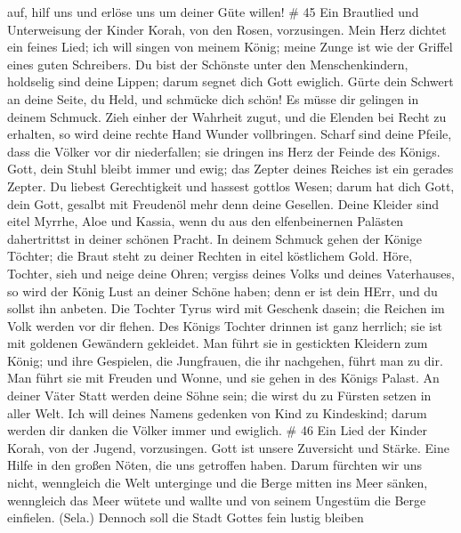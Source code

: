 auf, hilf uns und erlöse uns um deiner Güte willen! \# 45 
Ein Brautlied und Unterweisung der Kinder Korah, von den Rosen,
vorzusingen.  Mein Herz dichtet ein feines Lied; ich will
singen von meinem König; meine Zunge ist wie der Griffel eines guten
Schreibers.  Du bist der Schönste unter den Menschenkindern,
holdselig sind deine Lippen; darum segnet dich Gott ewiglich.
 Gürte dein Schwert an deine Seite, du Held, und schmücke
dich schön!  Es müsse dir gelingen in deinem Schmuck. Zieh
einher der Wahrheit zugut, und die Elenden bei Recht zu erhalten, so
wird deine rechte Hand Wunder vollbringen.  Scharf sind
deine Pfeile, dass die Völker vor dir niederfallen; sie dringen ins Herz
der Feinde des Königs.  Gott, dein Stuhl bleibt immer und
ewig; das Zepter deines Reiches ist ein gerades Zepter.  Du
liebest Gerechtigkeit und hassest gottlos Wesen; darum hat dich Gott,
dein Gott, gesalbt mit Freudenöl mehr denn deine Gesellen. 
Deine Kleider sind eitel Myrrhe, Aloe und Kassia, wenn du aus den
elfenbeinernen Palästen dahertrittst in deiner schönen Pracht.
 In deinem Schmuck gehen der Könige Töchter; die Braut
steht zu deiner Rechten in eitel köstlichem Gold.  Höre,
Tochter, sieh und neige deine Ohren; vergiss deines Volks und deines
Vaterhauses,  so wird der König Lust an deiner Schöne
haben; denn er ist dein HErr, und du sollst ihn anbeten. 
Die Tochter Tyrus wird mit Geschenk dasein; die Reichen im Volk werden
vor dir flehen.  Des Königs Tochter drinnen ist ganz
herrlich; sie ist mit goldenen Gewändern gekleidet.  Man
führt sie in gestickten Kleidern zum König; und ihre Gespielen, die
Jungfrauen, die ihr nachgehen, führt man zu dir.  Man führt
sie mit Freuden und Wonne, und sie gehen in des Königs Palast.
 An deiner Väter Statt werden deine Söhne sein; die wirst
du zu Fürsten setzen in aller Welt.  Ich will deines Namens
gedenken von Kind zu Kindeskind; darum werden dir danken die Völker
immer und ewiglich. \# 46  Ein Lied der Kinder Korah, von
der Jugend, vorzusingen.  Gott ist unsere Zuversicht und
Stärke. Eine Hilfe in den großen Nöten, die uns getroffen haben.
 Darum fürchten wir uns nicht, wenngleich die Welt
unterginge und die Berge mitten ins Meer sänken,  wenngleich
das Meer wütete und wallte und von seinem Ungestüm die Berge einfielen.
(Sela.)  Dennoch soll die Stadt Gottes fein lustig bleiben
